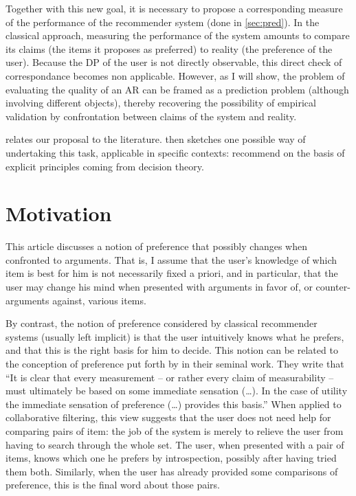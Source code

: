 \documentclass[french, english]{da2pl2018}
\begin{document}
Together with this new goal, it is necessary to propose a corresponding measure of the performance of the recommender system (done in \cref{sec:pred}). In the classical approach, measuring the performance of the system amounts to compare its claims (the items it proposes as preferred) to reality (the preference of the user). Because the \ac{DP} of the user is not directly observable, this direct check of correspondance becomes non applicable. However, as I will show, the problem of evaluating the quality of an \ac{AR} can be framed as a prediction problem (although involving different objects), thereby recovering the possibility of empirical validation by confrontation between claims of the system and reality.

 relates our proposal to the literature.  then sketches one possible way of undertaking this task, applicable in specific contexts: recommend on the basis of explicit principles coming from decision theory. 

\section{Motivation}
\label{sec:motiv}
This article discusses a notion of preference that possibly changes when confronted to arguments. That is, I assume that the user’s knowledge of which item is best for him is not necessarily fixed a priori, and in particular, that the user may change his mind when presented with arguments in favor of, or counter-arguments against, various items. 

By contrast, the notion of preference considered by classical recommender systems (usually left implicit) is that the user intuitively knows what he prefers, and that this is the right basis for him to decide. This notion can be related to the conception of preference put forth by \citet[p. 16]{von_neumann_theory_1944} in their seminal work. They write that “It is clear that every measurement – or rather every claim of measurability – must ultimately be based on some immediate sensation (…). In the case of utility the immediate sensation of preference (…) provides this basis.” When applied to collaborative filtering, this view suggests that the user does not need help for comparing pairs of item: the job of the system is merely to relieve the user from having to search through the whole set. 
The user, when presented with a pair of items, knows which one he prefers by introspection, possibly after having tried them both. %
Similarly, when the user has already provided some comparisons of preference, this is the final word about those pairs.
\end{document}
